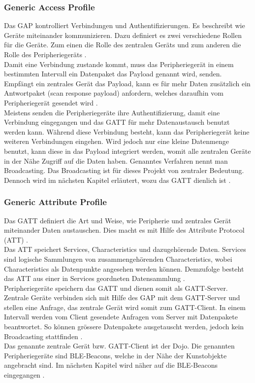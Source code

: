 \subsubsection{Generic Access Profile}
Das GAP kontrolliert Verbindungen und Authentifizierungen. Es beschreibt wie Geräte miteinander kommunizieren. Dazu definiert es zwei verschiedene Rollen für die Geräte. Zum einen die Rolle des zentralen Geräts und zum anderen die Rolle des Peripheriegeräts \cite{7_Teildokument_BT}.\\ [0.25cm]
Damit eine Verbindung zustande kommt, muss das Peripheriegerät in einem bestimmten Intervall ein Datenpaket das Payload genannt wird, senden. Empfängt ein zentrales Gerät das Payload, kann es für mehr Daten zusätzlich ein Antwortpaket (scan response payload) anfordern, welches daraufhin vom Peripheriegerät gesendet wird \cite{7_Teildokument_BT}.\\[0.25cm]
Meistens senden die Peripheriegeräte ihre Authentifizierung, damit eine Verbindung eingegangen und das GATT für mehr Datenaustausch benutzt werden kann. Während diese Verbindung besteht, kann das Peripheriegerät keine weiteren Verbindungen eingehen. Wird jedoch nur eine kleine Datenmenge benutzt, kann diese in das Payload integriert werden, womit alle zentralen Geräte in der Nähe Zugriff auf die Daten haben. Genanntes Verfahren nennt man Broadcasting. Das Broadcasting ist für dieses Projekt von zentraler Bedeutung. Dennoch wird im nächsten Kapitel erläutert, wozu das GATT dienlich ist \cite{7_Teildokument_BT}.\\

\subsubsection{Generic Attribute Profile}
Das GATT definiert die Art und Weise, wie Peripherie und zentrales Gerät miteinander Daten austauschen. Dies macht es mit Hilfe des Attribute Protocol (ATT) \cite{8_Teildokument_BT}.\\[0.25cm]
Das ATT speichert Services, Characteristics und dazugehörende Daten. Services sind logische Sammlungen von zusammengehörenden Characteristics, wobei Characteristics als Datenpunkte angesehen werden können. Demzufolge besteht das ATT aus einer in Services geordneten Datensammlung \cite{8_Teildokument_BT}.\\[0.25cm]
Peripheriegeräte speichern das GATT und dienen somit als GATT-Server. Zentrale Geräte verbinden sich mit Hilfe des GAP mit dem GATT-Server und stellen eine Anfrage, das zentrale Gerät wird somit zum GATT-Client. In einem Intervall werden vom Client gesendete Anfragen vom Server mit Datenpakete beantwortet. So können grössere Datenpakete ausgetauscht werden, jedoch kein Broadcasting stattfinden \cite{8_Teildokument_BT}.\\[0.25cm]
Das genannte zentrale Gerät bzw. GATT-Client ist der Dojo. Die genannten Peripheriegeräte sind BLE-Beacons, welche in der Nähe der Kunstobjekte angebracht sind. Im nächsten Kapitel wird näher auf die BLE-Beacons eingegangen \cite{8_Teildokument_BT}.\\

